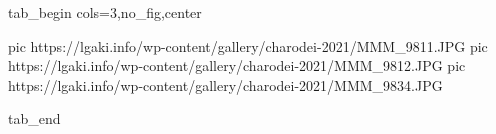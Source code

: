  
 
 
 
 


\ifcmt
  tab_begin cols=3,no_fig,center

     pic https://lgaki.info/wp-content/gallery/charodei-2021/MMM_9811.JPG
		 pic https://lgaki.info/wp-content/gallery/charodei-2021/MMM_9812.JPG
		 pic https://lgaki.info/wp-content/gallery/charodei-2021/MMM_9834.JPG

  tab_end
\fi
